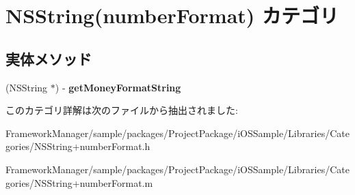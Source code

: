 \hypertarget{category_n_s_string_07number_format_08}{}\section{N\+S\+String(number\+Format) カテゴリ}
\label{category_n_s_string_07number_format_08}
\subsection*{実体メソッド}
\begin{DoxyCompactItemize}
\item 
\hypertarget{category_n_s_string_07number_format_08_affb529d741092e340f750621d446f13d}{}(N\+S\+String $\ast$) -\/ {\bfseries get\+Money\+Format\+String}\label{category_n_s_string_07number_format_08_affb529d741092e340f750621d446f13d}

\end{DoxyCompactItemize}


このカテゴリ詳解は次のファイルから抽出されました\+:\begin{DoxyCompactItemize}
\item 
Framework\+Manager/sample/packages/\+Project\+Package/i\+O\+S\+Sample/\+Libraries/\+Categories/N\+S\+String+number\+Format.\+h\item 
Framework\+Manager/sample/packages/\+Project\+Package/i\+O\+S\+Sample/\+Libraries/\+Categories/N\+S\+String+number\+Format.\+m\end{DoxyCompactItemize}
